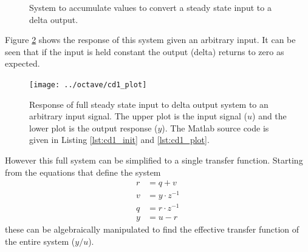 \documentclass{article}
\begin{document}
\begin{figure}[hpb!]
\begin{center}


\end{center}

\caption{System to accumulate values to convert a steady state
input to a delta output.}
\label{fig:cd1}
\end{figure}


Figure \ref{fig:cd1_plot} shows the response of this system given
an arbitrary input.
It can be seen that if the input is held constant the output (delta)
returns to zero as expected.

\begin{figure}[htbp!]
\texttt{[image: ../octave/cd1\_plot]}
\caption{Response of full steady state input to delta output system
to an arbitrary input signal.
The upper plot is the input signal ($u$) and the lower plot is
the output response ($y$).
The Matlab source code is given in Listing \ref{lst:cd1_init}
and \ref{lst:cd1_plot}.
}
\label{fig:cd1_plot}
\end{figure}

\begin{samepage}
However this full system can be simplified to a single transfer function.
Starting from the equations that define the system
\begin{align}
	r &= q + v \label{eq:cd1a} \\
	v &= y \cdot z^{-1} \label{eq:cd1b} \\
	q &= r \cdot z^{-1} \label{eq:cd1c} \\
	y &= u - r \label{eq:cd1d}
\end{align}
these can be algebraically manipulated to find the effective transfer
function of the entire system ($y/u$).
\end{samepage}
\end{document}

